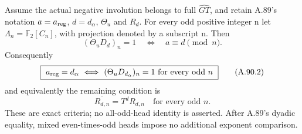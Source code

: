 Assume the actual negative involution belongs to full
\(\widehat{GT}\), and retain A.89's notation
\(a=a_{\rm reg}\), \(d=d_\alpha\), \(\Theta_u\) and \(R_d\).
For every odd positive integer n let
\(\Lambda_n=\mathbb F_2[C_n]\), with projection denoted by
a subscript n. Then
\[
 (\Theta_uD_d)_n=1
       \quad\Longleftrightarrow\quad a\equiv d\pmod n.
 \tag{A.90.1}
\]
Consequently
\[
 \boxed{\ a_{\rm reg}=d_\alpha
 \ \Longleftrightarrow\
 (\Theta_uD_{d_\alpha})_n=1\text{ for every odd }n\ }
 \tag{A.90.2}
\]
and equivalently the remaining condition is
\[
             \overline{R_{d,n}}=T^dR_{d,n}
                    \quad\text{for every odd }n.
 \tag{A.90.3}
\]
These are exact criteria; no all-odd-head identity is asserted.
After A.89's dyadic equality, mixed even-times-odd heads impose
no additional exponent comparison.

